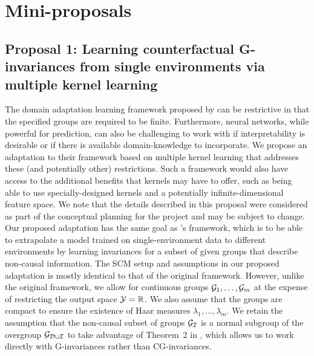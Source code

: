 

\section{Mini-proposals}

\subsection*{Proposal 1: Learning counterfactual G-invariances from single environments via multiple kernel learning}

The domain adaptation learning framework proposed by \textcite{Mouli:2021} can be restrictive in that the specified groups are required to be finite. Furthermore, neural networks, while powerful for prediction, can also be challenging to work with if interpretability is desirable or if there is available domain-knowledge to incorporate. We propose an adaptation to their framework based on multiple kernel learning \parencite{Gonen:2011} that addresses these (and potentially other) restrictions. Such a framework would also have access to the additional benefits that kernels may have to offer, such as being able to use specially-designed kernels and a potentially infinite-dimensional feature space. We note that the details described in this proposal were considered as part of the conceptual planning for the project and may be subject to change.
\\

Our proposed adaptation has the same goal as \citeauthor{Mouli:2021}'s framework, which is to be able to extrapolate a model trained on single-environment data to different environments by learning invariances for a subset of given groups that describe non-causal information. The SCM setup and assumptions in our proposed adaptation is mostly identical to that of the original framework. However, unlike the original framework, we allow for continuous groups $\mathcal{G}_1,\ldots,\mathcal{G}_m$ at the expense of restricting the output space $\mathcal{Y}=\mathbb{R}$. We also assume that the groups are compact to ensure the existence of Haar measures $\lambda_1,\ldots,\lambda_m$. We retain the assumption that the non-causal subset of groups $\mathcal{G}_{\mathcal{I}}$ is a normal subgroup of the overgroup $\mathcal{G}_{\mathcal{D}\cup\mathcal{I}}$ to take advantage of Theorem~2 in \parencite{Mouli:2021}, which allows us to work directly with G-invariances rather than CG-invariances.
\\

